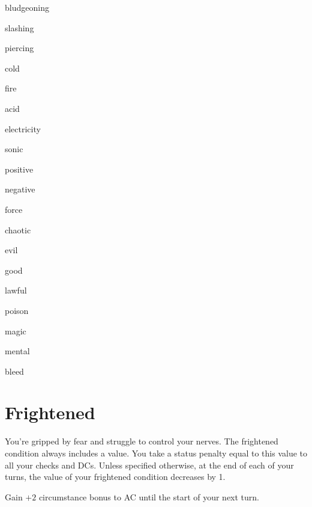 \documentclass[paper=63mm:88mm, DIV=21, fontsize=7.5pt]{scrartcl}
\begin{document}
\begin{multicols}{3}
\footnotesize

 bludgeoning

 slashing

 piercing

 cold

 fire

 acid

 electricity

 sonic

 positive

 negative

 force

 chaotic

 evil

 good

 lawful

 poison

 magic

 mental

 bleed

\end{multicols}

\section{Frightened}

You're gripped by fear and struggle to control your nerves.
The frightened condition always includes a value.
You take a status penalty equal to this value to all your checks and DCs.
Unless specified otherwise, at the end of each of your turns, the value of your frightened condition decreases by 1.






Gain \(+2\) circumstance bonus to AC until the start of your next turn.
\end{document}
